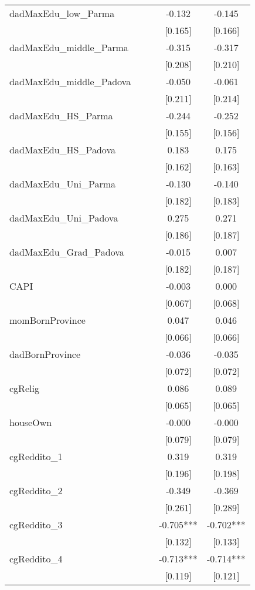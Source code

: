 \documentclass[]{article}
\begin{document}
\begin{tabular}{lcccc}
dadMaxEdu\_low\_Parma &  &  & -0.132 & -0.145 \\
 &  &  & [0.165] & [0.166] \\
dadMaxEdu\_middle\_Parma &  &  & -0.315 & -0.317 \\
 &  &  & [0.208] & [0.210] \\
dadMaxEdu\_middle\_Padova &  &  & -0.050 & -0.061 \\
 &  &  & [0.211] & [0.214] \\
dadMaxEdu\_HS\_Parma &  &  & -0.244 & -0.252 \\
 &  &  & [0.155] & [0.156] \\
dadMaxEdu\_HS\_Padova &  &  & 0.183 & 0.175 \\
 &  &  & [0.162] & [0.163] \\
dadMaxEdu\_Uni\_Parma &  &  & -0.130 & -0.140 \\
 &  &  & [0.182] & [0.183] \\
dadMaxEdu\_Uni\_Padova &  &  & 0.275 & 0.271 \\
 &  &  & [0.186] & [0.187] \\
dadMaxEdu\_Grad\_Padova &  &  & -0.015 & 0.007 \\
 &  &  & [0.182] & [0.187] \\
CAPI &  &  & -0.003 & 0.000 \\
 &  &  & [0.067] & [0.068] \\
momBornProvince &  &  & 0.047 & 0.046 \\
 &  &  & [0.066] & [0.066] \\
dadBornProvince &  &  & -0.036 & -0.035 \\
 &  &  & [0.072] & [0.072] \\
cgRelig &  &  & 0.086 & 0.089 \\
 &  &  & [0.065] & [0.065] \\
houseOwn &  &  & -0.000 & -0.000 \\
 &  &  & [0.079] & [0.079] \\
cgReddito\_1 &  &  & 0.319 & 0.319 \\
 &  &  & [0.196] & [0.198] \\
cgReddito\_2 &  &  & -0.349 & -0.369 \\
 &  &  & [0.261] & [0.289] \\
cgReddito\_3 &  &  & -0.705*** & -0.702*** \\
 &  &  & [0.132] & [0.133] \\
cgReddito\_4 &  &  & -0.713*** & -0.714*** \\
 &  &  & [0.119] & [0.121] \\

\end{tabular}
\end{document}
